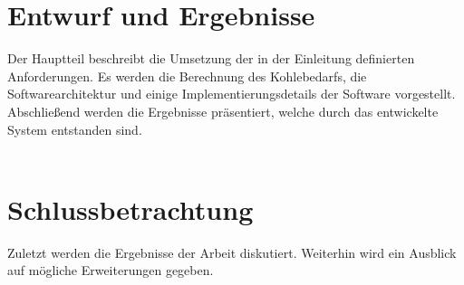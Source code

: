 \documentclass{scrbook} %
\begin{document}
	\chapter{Entwurf und Ergebnisse}
	Der Hauptteil beschreibt die Umsetzung der in der Einleitung definierten Anforderungen. Es werden die Berechnung des Kohlebedarfs, die Softwarearchitektur und einige Implementierungsdetails der Software vorgestellt. Abschließend werden die Ergebnisse präsentiert, welche durch das entwickelte System entstanden sind.\\
	\\
	
	
	
	

	\chapter{Schlussbetrachtung}
	Zuletzt werden die Ergebnisse der Arbeit diskutiert. Weiterhin wird ein Ausblick auf mögliche Erweiterungen gegeben.\\
	\\
	
	

	\ifisbook\cleardoubleemptypage\fi
	\printbibliography %

	\appendix %


	\ifisbook\pagestyle{plain}\cleardoubleemptypage\fi
\end{document}
